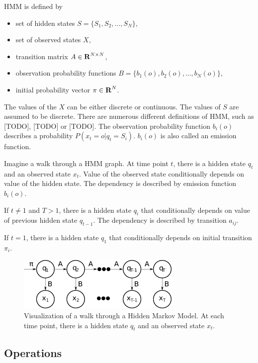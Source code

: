 \documentclass[thesis=B,english]{FITthesis}[2012/06/26]
\begin{document}
HMM is defined by
\begin{itemize}

\item set of hidden states $S = \{S_1, S_2, \dots, S_N\}$,
\item set of observed states $X$,
\item transition matrix $A \in \textbf R^{N \times N}$,
\item observation probability functions $B = \{b_1(o), b_2(o), \dots, b_N(o)\}$,
\item initial probability vector $\pi \in \textbf R^N$.

\end{itemize}

The values of the $X$ can be either discrete or continuous. The values of $S$ are assumed to be discrete. There are numerous different definitions of HMM, such as [TODO], [TODO] or [TODO]. The observation probability function $b_i(o)$ describes a probability $P(x_t = o | q_t = S_i)$. $b_i(o)$ is also called an emission function.


Imagine a walk through a HMM graph. At time point $t$, there is a hidden state $q_t$ and an observed state $x_t$. Value of the observed state conditionally depends on value of the hidden state. The dependency is described by emission function $b_i(o)$.

If $t \neq 1$ and $T > 1$, there is a hidden state $q_i$ that conditionally depends on value of previous hidden state $q_{t-1}$. The dependency is described by transition $a_{ij}$.

If $t = 1$, there is a hidden state $q_1$ that conditionally depends on initial transition $\pi_i$.

\begin{figure}
	\centering
 	\includegraphics[width=0.7\textwidth]{hmm}
 	\caption{Visualization of a walk through a Hidden Markov Model. At each time point, there is a hidden state $q_t$ and an observed state $x_t$.}
 	\label{fig:hmm}
\end{figure}

\subsection{Operations}
\end{document}
